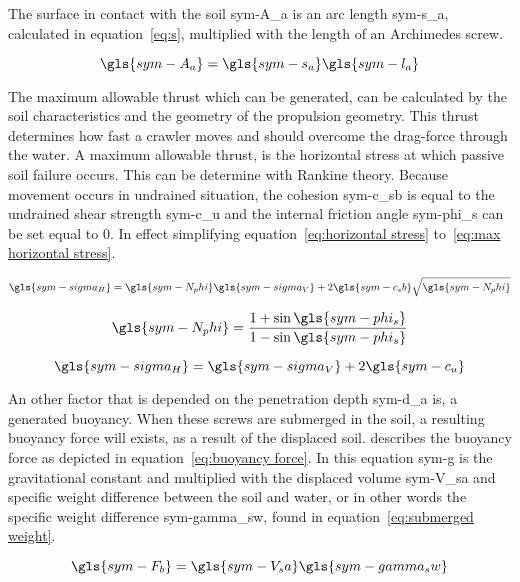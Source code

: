 \noindent The surface in contact with the soil \gls{sym-A_a} is an arc length \gls{sym-s_a}, calculated in
equation~\ref{eq:s}, multiplied with the length of an Archimedes screw.

\begin{equation}
    \label{eq:contact surface}
    \gls{sym-A_a}  = \gls{sym-s_a} \gls{sym-l_a}
\end{equation}

The maximum allowable thrust which can be generated, can be calculated by the soil characteristics and the geometry of
the propulsion geometry. This thrust determines how fast a crawler moves and should overcome the drag-force through the
water. A maximum allowable thrust, is the horizontal stress at which passive soil failure occurs. This can be determine
with Rankine theory. Because movement occurs in undrained situation, the cohesion \gls{sym-c_sb} is equal to the
undrained shear strength \gls{sym-c_u} and the internal friction angle \gls{sym-phi_s} can be set equal to \( 0 \). In
effect simplifying equation~\ref{eq:horizontal stress} to~\ref{eq:max horizontal stress}.

\begin{equation}
    \label{eq:horizontal stress}
    \gls{sym-sigma_H} = \gls{sym-N_phi} \gls{sym-sigma_V} + 2\gls{sym-c_sb}\sqrt{\gls{sym-N_phi}}
\end{equation}

\begin{equation}
    \gls{sym-N_phi} = \frac{1 + \sin \gls{sym-phi_s}}{1 - \sin \gls{sym-phi_s}}
\end{equation}

\begin{equation}
    \label{eq:max horizontal stress}
    \gls{sym-sigma_H} = \gls{sym-sigma_V} + 2\gls{sym-c_u}
\end{equation}

An other factor that is depended on the penetration depth \gls{sym-d_a} is, a generated buoyancy. When these screws are
submerged in the soil, a resulting buoyancy force will exists, as a result of the displaced soil.
\citet{lotman_applicable_2009} describes the buoyancy force as depicted in equation~\ref{eq:buoyancy force}. In this
equation \gls{sym-g} is the gravitational constant and multiplied with the displaced volume \gls{sym-V_sa} and specific
weight difference between the soil and water, or in other words the specific weight difference  \gls{sym-gamma_sw},
found in equation~\ref{eq:submerged weight}.

\begin{equation}
    \label{eq:buoyancy force}
    \gls{sym-F_b} = \gls{sym-V_sa} \gls{sym-gamma_sw}
\end{equation}

